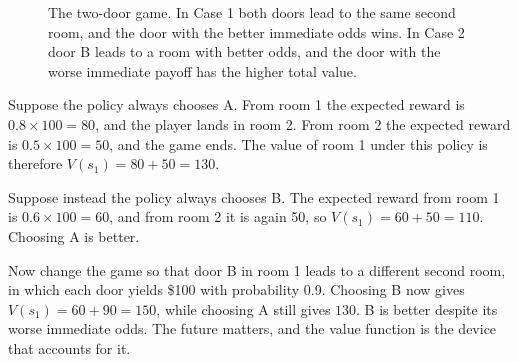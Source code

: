 \documentclass[11pt]{book}
\begin{document}
\begin{figure}[htbp]
\centering
{}
\caption{The two-door game. In Case 1 both doors lead to the same second room, and the door with the better immediate odds wins. In Case 2 door B leads to a room with better odds, and the door with the worse immediate payoff has the higher total value.}
\label{fig:two-door}
\end{figure}

Suppose the policy always chooses A. From room 1 the expected reward is $0.8 \times 100 = 80$, and the player lands in room 2. From room 2 the expected reward is $0.5 \times 100 = 50$, and the game ends. The value of room 1 under this policy is therefore $V(s_1) = 80 + 50 = 130$.

Suppose instead the policy always chooses B. The expected reward from room 1 is $0.6 \times 100 = 60$, and from room 2 it is again 50, so $V(s_1) = 60 + 50 = 110$. Choosing A is better.

Now change the game so that door B in room 1 leads to a different second room, in which each door yields \$100 with probability 0.9. Choosing B now gives $V(s_1) = 60 + 90 = 150$, while choosing A still gives $130$. B is better despite its worse immediate odds. The future matters, and the value function is the device that accounts for it.
\end{document}
